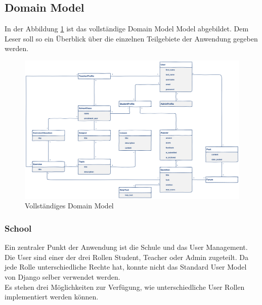 \subsection{Domain Model}
In der Abbildung \ref{fig:domain_model_full} ist das vollständige Domain Model Model abgebildet. Dem Leser soll so ein Überblick über die einzelnen Teilgebiete der Anwendung gegeben werden.

\begin{landscape}

\begin{minipage}{\textwidth}
	\begin{figure}[H]
	\begin{center}
		\includegraphics[width=1.4\textwidth, keepaspectratio]{images/domain_model_full.png}
  		\caption{Vollständiges Domain Model}
		\label{fig:domain_model_full}
	\end{center}
	\end{figure}
\end{minipage}

\end{landscape}

\subsubsection*{School}
Ein zentraler Punkt der Anwendung ist die Schule und das User Management. Die User sind einer der drei Rollen Student, Teacher oder Admin zugeteilt. Da jede Rolle unterschiedliche Rechte hat, konnte nicht das Standard User Model von Django selber verwendet werden. \\
Es stehen drei Möglichkeiten zur Verfügung, wie unterschiedliche User Rollen implementiert werden können.


